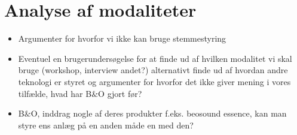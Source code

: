 \chapter{Analyse af modaliteter}
\label{Analyse af modaliteter}
%
\begin{itemize}
  \item Argumenter for hvorfor vi ikke kan bruge stemmestyring 
  \item Eventuel en brugerundersøgelse for at finde ud af hvilken modalitet vi skal bruge (workshop, interview andet?) alternativt finde ud af hvordan andre teknologi er styret og argumenter for hvorfor det ikke giver mening i vores tilfælde, hvad har B$\&$O gjort før?
  \item B$\&$O, inddrag nogle af deres produkter f.eks. beosound essence, kan man styre ens anlæg på en anden måde en med den?
\end{itemize}



